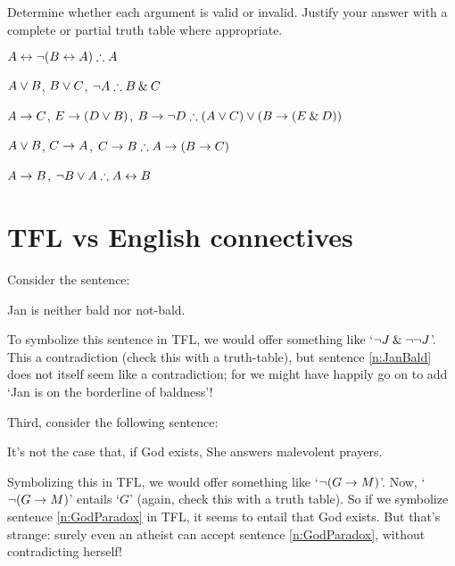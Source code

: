 \noindent\problempart Determine whether each argument is valid or invalid. Justify your answer with a complete or partial truth table where appropriate.
\label{pr.TT.valid6}
\begin{earg}
\item $A\eiff\enot(B\eiff A)\therefore A$ %
\item $A\vee B$, $B\vee C$, $\enot A\therefore B \eand C$ %
\item $A \rightarrow C$, $E \rightarrow (D \vee B)$, $B \eif \enot D\therefore (A \eor C) \eor (B \eif (E \eand D))$ %
\item $A \vee B$, $C \rightarrow A$, $C \eif B\therefore A \eif (B \eif C)$ %
\item $A \rightarrow B$, $\enot B \eor A\therefore A \eiff B$ %
\end{earg}

\chapter{TFL vs English connectives }\label{s:ParadoxesOfMaterialConditional}
Consider the sentence:
	\begin{earg}
		\item[\ex{n:JanBald}] Jan is neither bald nor not-bald.
	\end{earg}
To symbolize this sentence in TFL, we would offer something like `$\neg J \mathbin{\&} \neg \neg J$'. This a contradiction (check this with a truth-table), but sentence \ref{n:JanBald} does not itself seem like a contradiction; for we might have happily go on to add `Jan is on the borderline of baldness'!

Third, consider the following sentence:
	\begin{earg}
		\item[\ex{n:GodParadox}]	It's not the case that, if God exists, She answers malevolent prayers.
	\end{earg}
        Symbolizing this in TFL, we would offer something like `$\neg (G \rightarrow M)$'. Now, `$\neg (G \rightarrow M)$' entails `$G$' (again, check this with a truth table). So if we symbolize sentence \ref{n:GodParadox} in TFL, it seems to entail that God exists. But that's strange: surely even an atheist can accept sentence \ref{n:GodParadox}, without contradicting herself!

